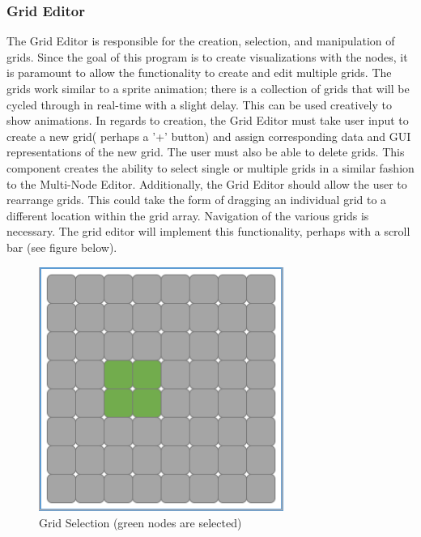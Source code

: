 \documentclass[12pt]{article}
\begin{document}
	\subsubsection {Grid Editor}
  	The Grid Editor is responsible for the creation, selection, and manipulation of grids. Since the goal of this program is to create visualizations with the nodes, it is paramount to allow the functionality to create and edit multiple grids. The grids work similar to a sprite animation; there is a collection of grids that will be cycled through in real-time with a slight delay. This can be used creatively to show animations.  	
  	In regards to creation, the Grid Editor must take user input to create a new grid( perhaps a '+' button) and assign corresponding data and GUI representations of the new grid. The user must also be able to delete grids. This component creates the ability to select single or multiple grids in a similar fashion to the Multi-Node Editor.  	
  	Additionally, the Grid Editor should allow the user to rearrange grids. This could take the form of dragging an individual grid to a different location within the grid array. Navigation of the various grids is necessary. The grid editor will implement this functionality, perhaps with a scroll bar (see figure below).	
    

  
  
  	\begin{figure}[ht!]
  		\centering
  		\includegraphics[width=80mm]{Grid.png}
  		\caption{Grid Selection (green nodes are selected)}
  	\end{figure}
  	
\end{document}
